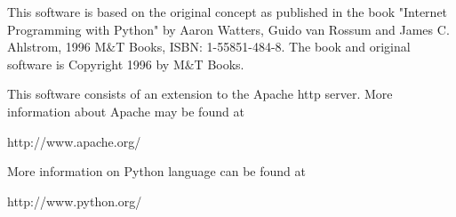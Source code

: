 This software is based on the original concept
as published in the book "Internet Programming with Python"
by Aaron Watters, Guido van Rossum and James C. Ahlstrom, 
1996 M\&T Books, ISBN: 1-55851-484-8. The book and original
software is Copyright 1996 by M\&T Books.

This software consists of an extension to the Apache http server.
More information about Apache may be found at 

http://www.apache.org/

More information on Python language can be found at

http://www.python.org/

